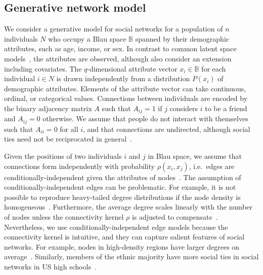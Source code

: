 \documentclass{scrartcl}
\newcommand{\population}{N}
\newcommand{\seeds}{U}
\newcommand{\nominees}{V}
\newcommand{\missing}{R}
\newcommand{\blauspace}{\mathbb{B}}
\newcommand{\titlecaption}[2]{\caption[#1]{\emph{#1} #2}}
\begin{document}
\subsection{Generative network model\label{sec:model}}


We consider a generative model for social networks for a population of $n$ individuals $\population$ who occupy a Blau space $\blauspace$ spanned by their demographic attributes, such as age, income, or sex. In contrast to common latent space models~\cite{Hoff2002, Hoff2008, Handcock2007}, the attributes are observed, although \textcite{Hoff2002} also consider an extension including covariates. The $q$-dimensional attribute vector $x_i\in\blauspace$ for each individual $i\in \population$ is drawn independently from a distribution $P(x_i)$ of demographic attributes. Elements of the attribute vector can take continuous, ordinal, or categorical values. Connections between individuals are encoded by the binary adjacency matrix $A$ such that $A_{ij}=1$ if $j$ considers $i$ to be a friend and $A_{ij}=0$ otherwise. We assume that people do not interact with themselves such that $A_{ii}=0$ for all $i$, and that connections are undirected, although social ties need not be reciprocated in general~\cite{Ball2013}.

Given the positions of two individuals $i$ and $j$ in Blau space, we assume that connections form independently with probability $\rho(x_i, x_j)$, i.e.\ edges are conditionally-independent given the attributes of nodes~\cite{Fienberg2012}. The assumption of conditionally-in\-de\-pen\-dent edges can be problematic. For example, it is not possible to reproduce heavy-tailed degree distributions if the node density is homogeneous~\cite{Barnett2007}. Furthermore, the average degree scales linearly with the number of nodes unless the connectivity kernel $\rho$ is adjusted to compensate~\cite{Caron2017}. Nevertheless, we use conditionally-independent edge models because the connectivity kernel is intuitive, and they can capture salient features of social networks. For example, nodes in high-density regions have larger degrees on average~\cite{Barnett2007}. Similarly, members of the ethnic majority have more social ties in social networks in US high schools~\cite{Currarini2009}.
\end{document}

